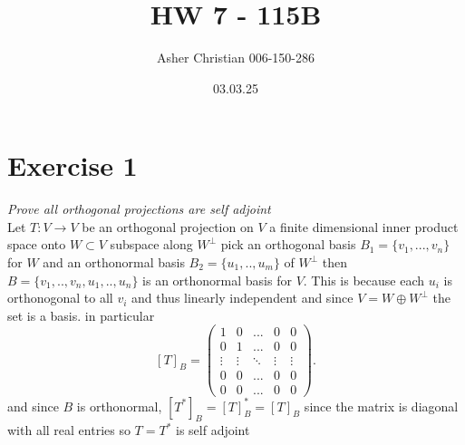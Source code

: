 \documentclass{article}
\title{HW 7 - 115B}
\author{Asher Christian 006-150-286}
\date{ 03.03.25}
\begin{document}
    \maketitle
    \section{Exercise 1}
    \emph{
        Prove all orthogonal projections are self adjoint
    }\\
    Let $T: V \rightarrow V$ be an orthogonal projection on $V$ a finite dimensional 
    inner product space onto $W \subset V$ subspace along $W^{\perp}$ pick an orthogonal basis
    $B_1 = \{v_1,...,v_n\}$ for $W$ and an orthonormal basis $B_2 = \{u_1,..,u_m\}$ of $W^{\perp}$
    then $B =\{v_1,..,v_n,u_1,..,u_n\}$ is an orthonormal basis for $V$. This is because each $u_i$ is
    orthonogonal to all $v_i$ and thus linearly independent and since $V = W \oplus W^{\perp}$ 
    the set is a basis. in particular
    \[
        [T]_B = \begin{pmatrix} 
            1 & 0 & ... & 0 & 0\\
            0 & 1 & ... & 0 & 0\\
            \vdots & \vdots & \ddots & \vdots & \vdots\\
            0 & 0 & ... & 0 & 0\\
            0 & 0 & ... & 0 & 0
        \end{pmatrix} 
    .\] 
    and since $B$ is orthonormal, $[T^{*}]_B =  [T]_B^{*} = [T]_B$ since the matrix is diagonal with all real entries so $T = T^{*}$ is self adjoint
\end{document}
